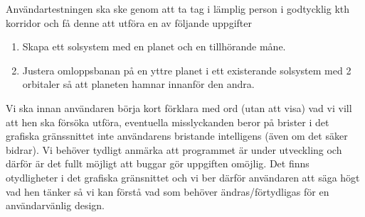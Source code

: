 Användartestningen ska ske genom att ta tag i lämplig person i godtycklig kth korridor och få denne att utföra en av följande uppgifter
\begin{enumerate}
    \item Skapa ett solsystem med en planet och en tillhörande måne.
    \item Justera omloppsbanan på en yttre planet i ett existerande solsystem med 2 orbitaler så att planeten hamnar innanför den andra.
\end{enumerate}

Vi ska innan användaren börja kort förklara med ord (utan att visa) vad vi vill att hen ska försöka utföra,
eventuella misslyckanden beror på brister i det grafiska gränssnittet inte användarens bristande intelligens (även om det säker bidrar).
Vi behöver tydligt anmärka att programmet är under utveckling och därför är det fullt möjligt att buggar gör uppgiften omöjlig.
Det finns otydligheter i det grafiska gränsnittet och vi ber därför användaren att säga högt vad hen tänker så vi kan förstå vad som behöver ändras/förtydligas för en användarvänlig design.

